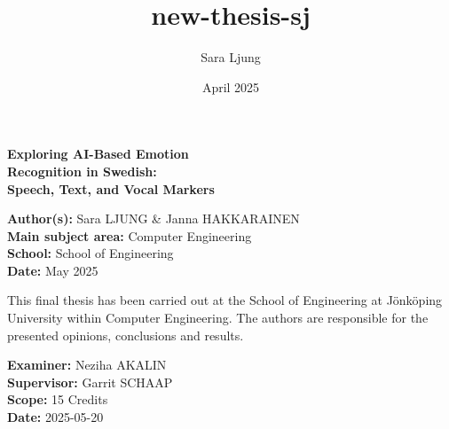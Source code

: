 \documentclass[a4paper, 12pt]{report}
\title{new-thesis-sj}
\author{Sara Ljung}
\date{April 2025}
\begin{document}

\vspace{6cm}
\begin{titlepage}
    \thispagestyle{empty} %


    \vspace*{6cm}
    \begin{center}
        \fontsize{30pt}{38pt}\selectfont\bfseries
        Exploring AI-Based Emotion \\
        Recognition in Swedish: \\
        Speech, Text, and Vocal Markers
    \end{center}

    \vfill
    
    \textbf{Author(s):} Sara LJUNG \&{} Janna HAKKARAINEN \\  
    \textbf{Main subject area:} Computer Engineering \\
    \textbf{School:} School of Engineering \\
    \textbf{Date:} May 2025

\end{titlepage}

\newpage
\vspace*{20cm}
\noindent
This final thesis has been carried out at the School of Engineering at J\"onk\"oping University within Computer Engineering. The authors are responsible for the presented opinions, conclusions and results.

\vspace{0.5cm}

\noindent\textbf{Examiner:} Neziha AKALIN \\
\textbf{Supervisor:} Garrit SCHAAP \\
\textbf{Scope:} 15 Credits \\
\textbf{Date:} 2025-05-20

\newpage



\newpage

\tableofcontents










\printbibliography


\end{document}
